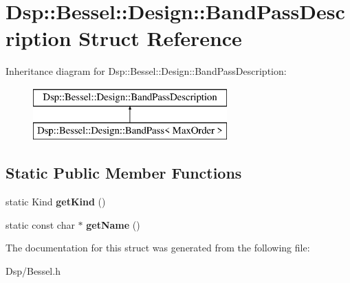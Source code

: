 \hypertarget{structDsp_1_1Bessel_1_1Design_1_1BandPassDescription}{\section{Dsp\-:\-:Bessel\-:\-:Design\-:\-:Band\-Pass\-Description Struct Reference}
\label{structDsp_1_1Bessel_1_1Design_1_1BandPassDescription}
}
Inheritance diagram for Dsp\-:\-:Bessel\-:\-:Design\-:\-:Band\-Pass\-Description\-:\begin{figure}[H]
\begin{center}
\leavevmode
\includegraphics[height=2.000000cm]{structDsp_1_1Bessel_1_1Design_1_1BandPassDescription}
\end{center}
\end{figure}
\subsection*{Static Public Member Functions}
\begin{DoxyCompactItemize}
\item 
\hypertarget{structDsp_1_1Bessel_1_1Design_1_1BandPassDescription_a659081dd974d53b18c28959bd7796418}{static Kind {\bfseries get\-Kind} ()}\label{structDsp_1_1Bessel_1_1Design_1_1BandPassDescription_a659081dd974d53b18c28959bd7796418}

\item 
\hypertarget{structDsp_1_1Bessel_1_1Design_1_1BandPassDescription_abbcb8bf714ba9ffbc24e3ce780e996e5}{static const char $\ast$ {\bfseries get\-Name} ()}\label{structDsp_1_1Bessel_1_1Design_1_1BandPassDescription_abbcb8bf714ba9ffbc24e3ce780e996e5}

\end{DoxyCompactItemize}


The documentation for this struct was generated from the following file\-:\begin{DoxyCompactItemize}
\item 
Dsp/Bessel.\-h\end{DoxyCompactItemize}
